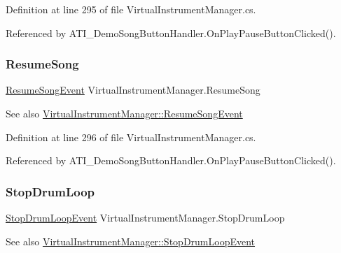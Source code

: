 Definition at line 295 of file Virtual\+Instrument\+Manager.\+cs.



Referenced by A\+T\+I\+\_\+\+Demo\+Song\+Button\+Handler.\+On\+Play\+Pause\+Button\+Clicked().

\mbox{\label{group___v_i_m_events_ga01670916ae3917c84a0fb51667f30ab9}} 
\subsubsection{\texorpdfstring{Resume\+Song}{ResumeSong}}
{\footnotesize\ttfamily \hyperlink{group___v_i_m_event_types_class_virtual_instrument_manager_1_1_resume_song_event}{Resume\+Song\+Event} Virtual\+Instrument\+Manager.\+Resume\+Song}

\begin{DoxySeeAlso}{See also}
\hyperlink{group___v_i_m_event_types_class_virtual_instrument_manager_1_1_resume_song_event}{Virtual\+Instrument\+Manager\+::\+Resume\+Song\+Event} 
\end{DoxySeeAlso}


Definition at line 296 of file Virtual\+Instrument\+Manager.\+cs.



Referenced by A\+T\+I\+\_\+\+Demo\+Song\+Button\+Handler.\+On\+Play\+Pause\+Button\+Clicked().

\mbox{\label{group___v_i_m_events_ga9466995fd3b4a07351a8577042ee8b31}} 
\subsubsection{\texorpdfstring{Stop\+Drum\+Loop}{StopDrumLoop}}
{\footnotesize\ttfamily \hyperlink{group___v_i_m_event_types_class_virtual_instrument_manager_1_1_stop_drum_loop_event}{Stop\+Drum\+Loop\+Event} Virtual\+Instrument\+Manager.\+Stop\+Drum\+Loop}

\begin{DoxySeeAlso}{See also}
\hyperlink{group___v_i_m_event_types_class_virtual_instrument_manager_1_1_stop_drum_loop_event}{Virtual\+Instrument\+Manager\+::\+Stop\+Drum\+Loop\+Event} 
\end{DoxySeeAlso}


